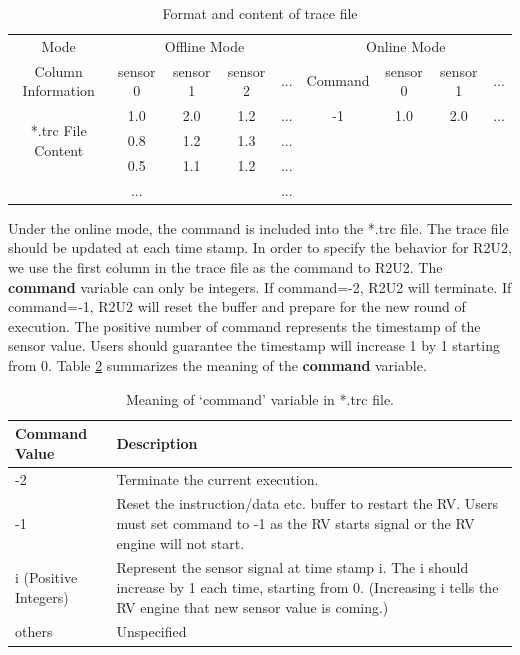 \begin{table}[ht]
  \caption{Format and content of trace file}
  \label{tab:c_trace}
  \begin{center}
  \begin{tabular}{c|cccc|cccc}
      \hline
      Mode&\multicolumn{4}{c|}{Offline Mode}&\multicolumn{4}{c}{Online Mode}\\
      \cline{1-9}
      \multirow{1}{*}{Column Information}&sensor 0&sensor 1&sensor 2&\multicolumn{1}{c|}{...}&Command&sensor 0&sensor 1&...\\
      \hline
      \multirow{3}{*}{*.trc File Content}& 1.0 & 2.0 & 1.2 &...& -1 & 1.0 & 2.0 &...\\
      & 0.8 & 1.2 & 1.3 &...  & & & \\
      & 0.5 & 1.1 & 1.2 &... & & &  \\
      &...& & & ...& & & \\
      \hline
  \end{tabular}
  \end{center}
  \label{tab:multicol}
  \end{table}
Under the online mode, the command is included into the *.trc file. The trace file should be updated at each time stamp. In order to specify the behavior for R2U2, we use the first column in the trace file as the command to R2U2. The \textbf{command} variable can only be integers. If command=-2, R2U2 will terminate. If command=-1, R2U2 will reset the buffer and prepare for the new round of execution. The positive number of command represents the timestamp of the sensor value. Users should guarantee the timestamp will increase 1 by 1 starting from 0. Table \ref{tab:c_command_trace} summarizes the meaning of the \textbf{command} variable.
\begin{table}[h]
  \begin{tabularx}{\textwidth}{ |l|X| } 
   \hline
   Command Value & Description \\ 
   \hline
   -2 & Terminate the current execution. \\ 
   \hline
   -1 & Reset the instruction/data etc. buffer to restart the RV. Users must set command to -1 as the RV starts signal or the RV engine will not start.\\ 
   \hline
   i (Positive Integers) & Represent the sensor signal at time stamp i. The i should increase by 1 each time, starting from 0. (Increasing i tells the RV engine that new sensor value is coming.)\\
   \hline
   others & Unspecified\\
   \hline
  \end{tabularx}
  \caption{Meaning of `command' variable in *.trc file.}
  \label{tab:c_command_trace}
\end{table}


